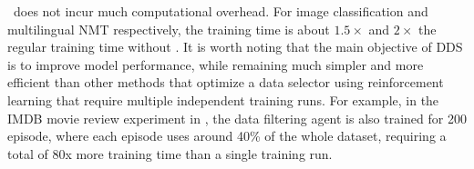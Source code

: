 \dds~does not incur much computational overhead. For image classification and multilingual NMT respectively, the training time is about $1.5\times$ and $2\times$ the regular training time without \dds. It is worth noting that the main objective of DDS is to improve model performance, while remaining much simpler and more efficient than other methods that optimize a data selector using reinforcement learning that require multiple independent training runs. For example, in the IMDB movie review experiment in  \citet{learn_what_data_learn}, the data filtering agent is also trained for 200 episode, where each episode uses around 40\% of the whole dataset, requiring a total of 80x more training time than a single training run. 
